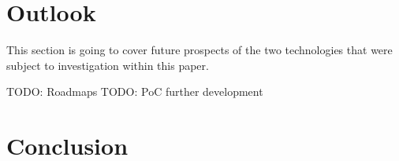 \section{Outlook}

This section is going to cover future prospects of the two technologies that were subject to investigation within this paper.

TODO: Roadmaps
TODO: PoC further development

%
%
%
%
%
%
%
%
%


\section{Conclusion}
\label{conclusion}


